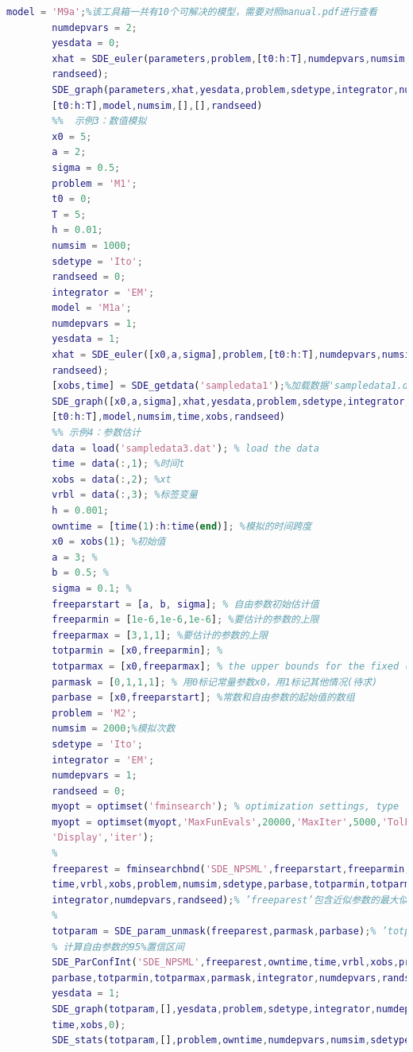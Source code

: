 \begin{lstlisting}[language= Matlab]
        model = 'M9a';%该工具箱一共有10个可解决的模型，需要对照manual.pdf进行查看
        numdepvars = 2;
        yesdata = 0;
        xhat = SDE_euler(parameters,problem,[t0:h:T],numdepvars,numsim,sdetype,...
        randseed);
        SDE_graph(parameters,xhat,yesdata,problem,sdetype,integrator,numdepvars,...
        [t0:h:T],model,numsim,[],[],randseed)
        %%  示例3：数值模拟
        x0 = 5;
        a = 2;
        sigma = 0.5;
        problem = 'M1';
        t0 = 0;
        T = 5;
        h = 0.01;
        numsim = 1000;
        sdetype = 'Ito';
        randseed = 0;
        integrator = 'EM';
        model = 'M1a';
        numdepvars = 1;
        yesdata = 1;
        xhat = SDE_euler([x0,a,sigma],problem,[t0:h:T],numdepvars,numsim,sdetype,...
        randseed);
        [xobs,time] = SDE_getdata('sampledata1');%加载数据'sampledata1.dat'
        SDE_graph([x0,a,sigma],xhat,yesdata,problem,sdetype,integrator,numdepvars,...
        [t0:h:T],model,numsim,time,xobs,randseed)
        %% 示例4：参数估计
        data = load('sampledata3.dat'); % load the data
        time = data(:,1); %时间t
        xobs = data(:,2); %xt
        vrbl = data(:,3); %标签变量
        h = 0.001;
        owntime = [time(1):h:time(end)]; %模拟的时间跨度
        x0 = xobs(1); %初始值
        a = 3; %
        b = 0.5; %
        sigma = 0.1; %
        freeparstart = [a, b, sigma]; % 自由参数初始估计值
        freeparmin = [1e-6,1e-6,1e-6]; %要估计的参数的上限
        freeparmax = [3,1,1]; %要估计的参数的上限
        totparmin = [x0,freeparmin]; %
        totparmax = [x0,freeparmax]; % the upper bounds for the fixed (x0) and the free to vary parameters
        parmask = [0,1,1,1]; % 用0标记常量参数x0，用1标记其他情况(待求)
        parbase = [x0,freeparstart]; %常数和自由参数的起始值的数组
        problem = 'M2';
        numsim = 2000;%模拟次数
        sdetype = 'Ito';
        integrator = 'EM';
        numdepvars = 1;
        randseed = 0;
        myopt = optimset('fminsearch'); % optimization settings, type ’help optimset’ for details
        myopt = optimset(myopt,'MaxFunEvals',20000,'MaxIter',5000,'TolFun',1.e-4,'TolX',1.e-4,...
        'Display','iter');
        %
        freeparest = fminsearchbnd('SDE_NPSML',freeparstart,freeparmin,freeparmax,myopt,owntime,...
        time,vrbl,xobs,problem,numsim,sdetype,parbase,totparmin,totparmax,parmask,...
        integrator,numdepvars,randseed);% ’freeparest’包含近似参数的最大似然估计
        %
        totparam = SDE_param_unmask(freeparest,parmask,parbase);% ’totparam’包含固定的数组和参数
        % 计算自由参数的95%置信区间
        SDE_ParConfInt('SDE_NPSML',freeparest,owntime,time,vrbl,xobs,problem,numsim,sdetype,...
        parbase,totparmin,totparmax,parmask,integrator,numdepvars,randseed);
        yesdata = 1;
        SDE_graph(totparam,[],yesdata,problem,sdetype,integrator,numdepvars,owntime,[],numsim,...
        time,xobs,0);
        SDE_stats(totparam,[],problem,owntime,numdepvars,numsim,sdetype,integrator,0);
        \end{lstlisting}




% 
